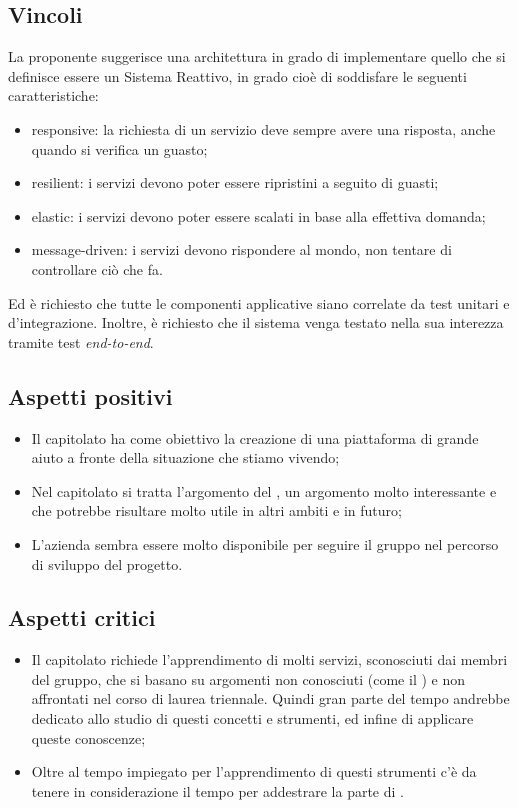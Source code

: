 \subsection{Vincoli}
La proponente suggerisce una architettura in grado di implementare quello che si definisce essere un Sistema Reattivo, in grado cioè di soddisfare le seguenti caratteristiche: 
\begin{itemize}
\item responsive: la richiesta di un servizio deve sempre avere una risposta, anche quando si verifica un guasto; 
\item resilient: i servizi devono poter essere ripristini a seguito di guasti; 
\item elastic: i servizi devono poter essere scalati in base alla effettiva domanda; 
\item message-driven: i servizi devono rispondere al mondo, non tentare di controllare ciò che fa.  
\end{itemize}
Ed è richiesto che tutte le componenti applicative siano correlate da test unitari e d’integrazione. Inoltre, è richiesto che il sistema venga testato nella sua interezza tramite test \textit{end-to-end}. 

\subsection{Aspetti positivi}
\begin{itemize}
\item Il capitolato ha come obiettivo la creazione di una piattaforma di grande aiuto a fronte della situazione che stiamo vivendo;
\item Nel capitolato si tratta l'argomento del , un argomento molto interessante e che potrebbe risultare molto utile in altri ambiti e in futuro;
\item L'azienda sembra essere molto disponibile per seguire il gruppo nel percorso di sviluppo del progetto.
\end{itemize}

\subsection{Aspetti critici}
\begin{itemize}
\item Il capitolato richiede l'apprendimento di molti servizi, sconosciuti dai membri del gruppo, che si basano su argomenti non conosciuti (come il ) e non affrontati nel corso di laurea triennale. Quindi gran parte del tempo andrebbe dedicato allo studio di questi concetti e strumenti, ed infine di applicare queste conoscenze;
\item Oltre al tempo impiegato per l'apprendimento di questi strumenti c'è da tenere in considerazione il tempo per addestrare la parte di .
\end{itemize}


